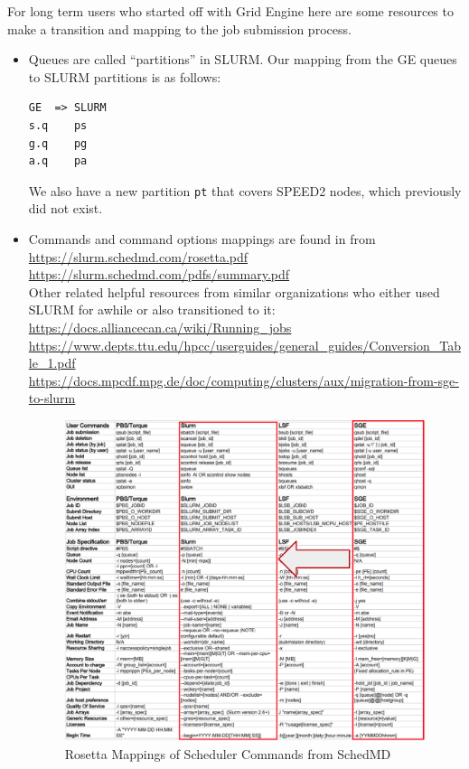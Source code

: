\documentclass{easychair}
\begin{document}
For long term users who started off with Grid Engine here are some resources
to make a transition and mapping to the job submission process.

\begin{itemize}
\item
Queues are called ``partitions'' in SLURM. Our mapping from the GE queues
to SLURM partitions is as follows:
\begin{verbatim}
GE  => SLURM
s.q    ps
g.q    pg
a.q    pa
\end{verbatim}
We also have a new partition \texttt{pt} that covers SPEED2 nodes,
which previously did not exist.

\item
Commands and command options mappings are found in  from\\
\url{https://slurm.schedmd.com/rosetta.pdf}\\
\url{https://slurm.schedmd.com/pdfs/summary.pdf}\\
Other related helpful resources from similar organizations who either used
SLURM for awhile or also transitioned to it:\\
\small
\url{https://docs.alliancecan.ca/wiki/Running_jobs}\\
\url{https://www.depts.ttu.edu/hpcc/userguides/general_guides/Conversion_Table_1.pdf}\\
\url{https://docs.mpcdf.mpg.de/doc/computing/clusters/aux/migration-from-sge-to-slurm}
\normalsize

\begin{figure}[htpb]
\includegraphics[width=\columnwidth]{images/rosetta-mapping}
\caption{Rosetta Mappings of Scheduler Commands from SchedMD}
\label{fig:rosetta-mappings}
\end{figure}


\end{itemize}
\end{document}
